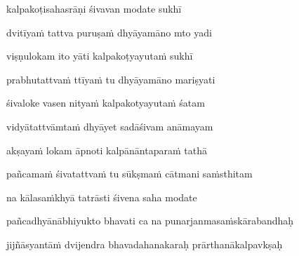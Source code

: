 kalpakoṭisahasrāṇi śivavan modate sukhī \veg\dontdisplaylinenum
{}

dvitīyaṁ tattva puruṣaṁ dhyāyamāno mto yadi\thinspace{\dandab} \dontdisplaylinenum

viṣṇulokam ito yāti kalpakoṭyayutaṁ sukhī \veg\dontdisplaylinenum
{}

prabhutattvaṁ ttīyaṁ tu dhyāyamāno mariṣyati\thinspace{\dandab} \dontdisplaylinenum

śivaloke vasen nityaṁ kalpakotyayutaṁ śatam \veg\dontdisplaylinenum
{}

vidyātattvāmtaṁ dhyāyet sadāśivam anāmayam\thinspace{\dandab} \dontdisplaylinenum

akṣayaṁ lokam āpnoti kalpānāntaparaṁ tathā \veg\dontdisplaylinenum 
{}

pañcamaṁ śivatattvaṁ tu sūkṣmaṁ cātmani saṁsthitam\thinspace{\dandab} \dontdisplaylinenum

na kālasaṁkhyā tatrāsti śivena saha modate \veg\dontdisplaylinenum

\ujvers\nemsloka 
pañcadhyānābhiyukto bhavati ca na punarjanmasaṁskārabandhaḥ
\dontdisplaylinenum

\nemslokab 
jijñāsyantāṁ dvijendra bhavadahanakaraḥ prārthanākalpavkṣaḥ \danda\dontdisplaylinenum

